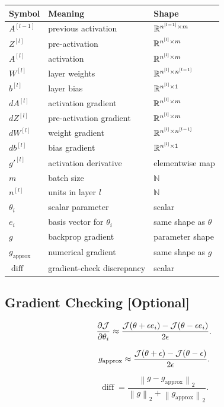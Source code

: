 \begin{center}
\begin{tabular}{lll}
\toprule
Symbol & Meaning & Shape \\
\midrule
$A^{[l-1]}$ & previous activation & $\mathbb{R}^{n^{[l-1]} \times m}$ \\
$Z^{[l]}$ & pre-activation & $\mathbb{R}^{n^{[l]} \times m}$ \\
$A^{[l]}$ & activation & $\mathbb{R}^{n^{[l]} \times m}$ \\
$W^{[l]}$ & layer weights & $\mathbb{R}^{n^{[l]} \times n^{[l-1]}}$ \\
$b^{[l]}$ & layer bias & $\mathbb{R}^{n^{[l]} \times 1}$ \\
$dA^{[l]}$ & activation gradient & $\mathbb{R}^{n^{[l]} \times m}$ \\
$dZ^{[l]}$ & pre-activation gradient & $\mathbb{R}^{n^{[l]} \times m}$ \\
$dW^{[l]}$ & weight gradient & $\mathbb{R}^{n^{[l]} \times n^{[l-1]}}$ \\
$db^{[l]}$ & bias gradient & $\mathbb{R}^{n^{[l]} \times 1}$ \\
$g'^{[l]}$ & activation derivative & elementwise map \\
$m$ & batch size & $\mathbb{N}$ \\
$n^{[l]}$ & units in layer $l$ & $\mathbb{N}$ \\
$\theta_i$ & scalar parameter & scalar \\
$e_i$ & basis vector for $\theta_i$ & same shape as $\theta$ \\
$g$ & backprop gradient & parameter shape \\
$g_{\mathrm{approx}}$ & numerical gradient & same shape as $g$ \\
$\operatorname{diff}$ & gradient-check discrepancy & scalar \\
\bottomrule
\end{tabular}
\end{center}

\subsection{Gradient Checking \textbf{[Optional]}}

\[
\frac{\partial \mathcal{J}}{\partial \theta_i}
\approx
\frac{
\mathcal{J}(\theta+\epsilon e_i)
-
\mathcal{J}(\theta-\epsilon e_i)
}{
2\epsilon
}.
\]

\[
g_{\mathrm{approx}}
\approx
\frac{
\mathcal{J}(\theta+\epsilon)
-
\mathcal{J}(\theta-\epsilon)
}{
2\epsilon
}.
\]

\[
\operatorname{diff}
=
\frac{
\left\lVert g-g_{\mathrm{approx}}\right\rVert_2
}{
\left\lVert g\right\rVert_2
+
\left\lVert g_{\mathrm{approx}}\right\rVert_2
}.
\]
